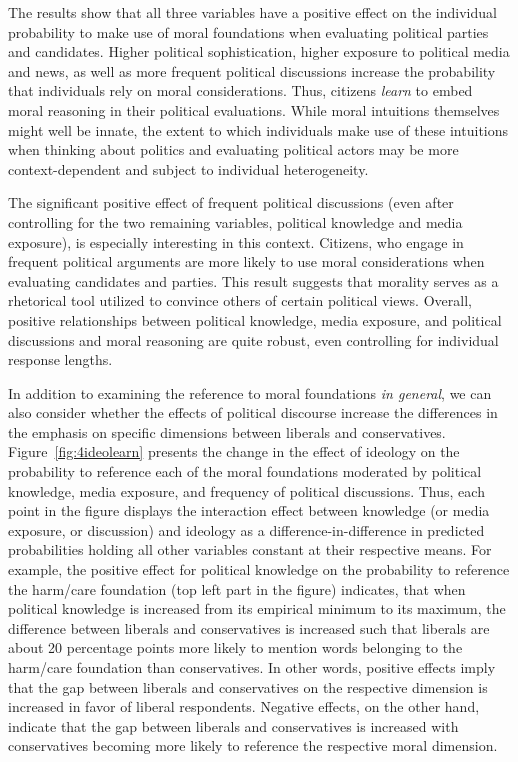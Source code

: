 \documentclass[12pt]{article}
\begin{document}
The results show that all three variables have a positive effect on the individual probability to make use of moral foundations when evaluating political parties and candidates. Higher political sophistication, higher exposure to political media and news, as well as more frequent political discussions increase the probability that individuals rely on moral considerations. Thus, citizens \textit{learn} to embed moral reasoning in their political evaluations. While moral intuitions themselves might well be innate, the extent to which individuals make use of these intuitions when thinking about politics and evaluating political actors may be more context-dependent and subject to individual heterogeneity.

The significant positive effect of frequent political discussions (even after controlling for the two remaining variables, political knowledge and media exposure), is especially interesting in this context. Citizens, who engage in frequent political arguments are more likely to use moral considerations when evaluating candidates and parties. This result suggests that morality serves as a rhetorical tool utilized to convince others of certain political views. Overall, positive relationships between political knowledge, media exposure, and political discussions and moral reasoning are quite robust, even controlling for individual response lengths.

In addition to examining the reference to moral foundations \textit{in general}, we can also consider whether the effects of political discourse increase the differences in the emphasis on specific dimensions between liberals and conservatives. Figure~\ref{fig:4ideolearn} presents the change in the effect of ideology on the probability to reference each of the moral foundations moderated by political knowledge, media exposure, and frequency of political discussions. Thus, each point in the figure displays the interaction effect between knowledge (or media exposure, or discussion) and ideology as a difference-in-difference in predicted probabilities holding all other variables constant at their respective means. For example, the positive effect for political knowledge on the probability to reference the harm/care foundation (top left part in the figure) indicates, that when political knowledge is increased from its empirical minimum to its maximum, the difference between liberals and conservatives is increased such that liberals are about 20 percentage points more likely to mention words belonging to the harm/care foundation than conservatives. In other words, positive effects imply that the gap between liberals and conservatives on the respective dimension is increased in favor of liberal respondents. Negative effects, on the other hand, indicate that the gap between liberals and conservatives is increased with conservatives becoming more likely to reference the respective moral dimension.
\end{document}
